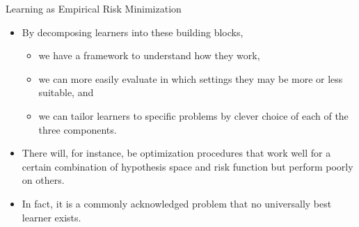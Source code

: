 \documentclass[11pt,compress,t,notes=noshow, xcolor=table]{beamer}
\begin{document}
\begin{vbframe}{Learning as Empirical Risk Minimization}

\begin{itemize}

  \item By decomposing learners into these building blocks,
  
  \begin{itemize}

    \item we have a framework to understand how they work,
    
    \item we can more easily evaluate in which settings they may be more or less 
    suitable, and
    
    \item we can tailor learners to specific problems by clever choice of each 
    of the three components.
    
  \end{itemize}
  
  \item There will, for instance, be optimization procedures that work well for
  a certain combination of hypothesis space and risk function but perform poorly 
  on others.
  
  \item In fact, it is a commonly acknowledged problem that no universally best
  learner exists.

\end{itemize}

\end{vbframe}


\endlecture
\end{document}
